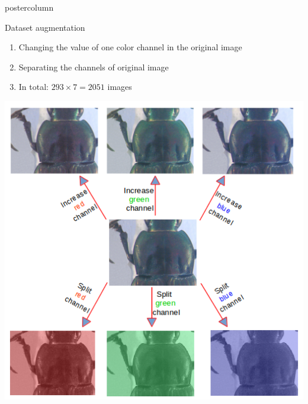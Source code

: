 \begin{frame}
\begin{columns}
\begin{column}{.49\textwidth}
\begin{beamercolorbox}[center,wd=\textwidth]{postercolumn}
\begin{minipage}[T]{.95\textwidth}
{            \vfill
            
            \begin{block}{Dataset augmentation}
            	\begin{enumerate}
            		\item Changing the value of one color channel in the original image
            		\item Separating the channels of original image
            		\item In total: $293 \times 7 = 2051$ images 
            	\end{enumerate}
            \centering
            
            \includegraphics[width=.7\textwidth]{images/data_aug.png}
            
            \end{block}
            
            \vfill
            
}
\end{minipage}
\end{beamercolorbox}
\end{column}
\end{columns}
\end{frame}
